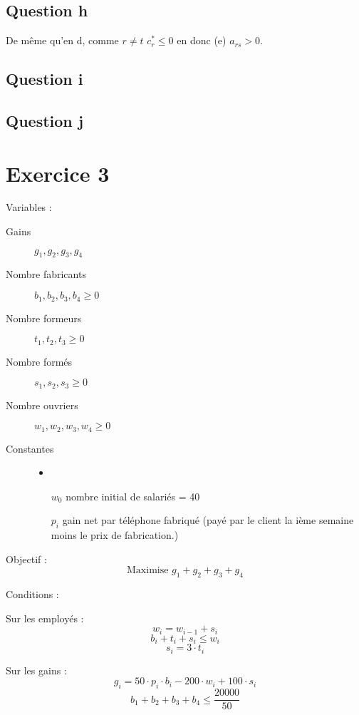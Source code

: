 \documentclass{article}
\begin{document}
\subsection*{Question h} 

De même qu'en d, comme $r\neq t$ $c_r^* \leq 0$ en donc (e) $a_{rs}>0$.

\subsection*{Question i} 

\subsection*{Question j} 




\section*{Exercice 3}

Variables :
\begin{description}
\item[Gains] $g_1,g_2,g_3,g_4$
\item[Nombre fabricants] $b_1,b_2,b_3,b_4\geq 0$
\item[Nombre formeurs] $t_1,t_2,t_3\geq 0$
\item[Nombre formés] $s_1,s_2,s_3\geq 0$
\item[Nombre ouvriers] $w_1,w_2,w_3,w_4\geq 0$
\item[Constantes]
\begin{itemize}
\item
\item[$w_0$] nombre initial de salariés = 40
\item[$p_i$] gain net par téléphone fabriqué (payé par le client la ième semaine moins le prix de fabrication.)
\end{itemize}
\end{description}


Objectif : $$\text{Maximise }g_1+g_2+g_3+g_4$$

Conditions : 

Sur les employés :
$$w_i =  w_{i-1}+s_i$$
$$b_i+t_i+s_i\leq w_i$$
$$s_i=3\cdot t_i$$

Sur les gains :
$$g_i = 50\cdot p_i \cdot b_i-200\cdot w_i+100\cdot s_i$$
$$b_1+b_2+b_3+b_4\leq \frac{20000}{50}$$
\end{document}
